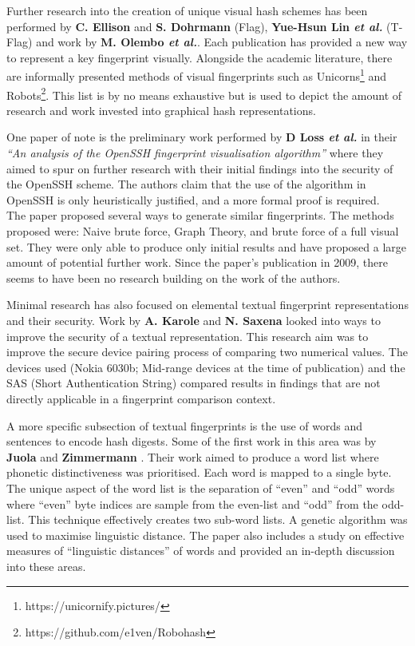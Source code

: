 Further research into the creation of unique visual hash schemes has been performed by \textbf{C. Ellison} and \textbf{S. Dohrmann}\cite{ellison2003public} (Flag), \textbf{Yue-Hsun Lin \textit{et al.}}\cite{lin2010spate} (T-Flag) and work by \textbf{M.  Olembo \textit{et al.}}\cite{olembo2013developing}. Each publication has provided a new way  to represent a key fingerprint visually. Alongside the academic literature, there are informally presented methods of visual fingerprints such as Unicorns\footnote{https://unicornify.pictures/} and Robots\footnote{https://github.com/e1ven/Robohash}. This list is by no means exhaustive but is used to depict the amount of research and work invested into graphical hash representations.

One paper of note is the preliminary work performed by \textbf{D Loss \textit{et al.}}\cite{loss2009drunken} in their \textit{``An analysis of the OpenSSH fingerprint visualisation algorithm''} where  they aimed to spur on further research with their initial findings into the security of the OpenSSH scheme. The authors claim that the use of the algorithm in OpenSSH is only heuristically justified, and a more formal proof is required.\\
The paper proposed several ways to generate similar fingerprints. The methods proposed were: Naive brute force, Graph Theory, and brute force of a full visual set. They were only able to produce only initial results and have proposed a large amount of potential further work. Since the paper's publication in 2009, there seems to have been no research building on the work of the authors.

Minimal research has also focused on elemental textual fingerprint representations and their security. Work by \textbf{A. Karole} and \textbf{N. Saxena}\cite{karole2009improving} looked into ways to improve the security of a textual representation. This research aim was to improve the secure device pairing process of comparing two numerical values. The devices used (Nokia 6030b; Mid-range devices at the time of publication) and the SAS (Short Authentication String) compared results in findings that are not directly applicable in a fingerprint comparison context. 

A more specific subsection of textual fingerprints is the use of words and sentences to encode hash digests. Some of the first work in this area was by \textbf{Juola} and \textbf{Zimmermann} \cite{juola1996whole}. Their work aimed to produce a word list where phonetic distinctiveness was prioritised. Each word is mapped to a single byte. The unique aspect of the word list is the separation of ``even'' and ``odd'' words where ``even'' byte indices are sample from the even-list and ``odd'' from the odd-list. This technique effectively creates two sub-word lists.  A genetic algorithm was used to maximise linguistic distance. The paper also includes a study on effective measures of ``linguistic distances'' of words and provided an in-depth discussion into these areas.

